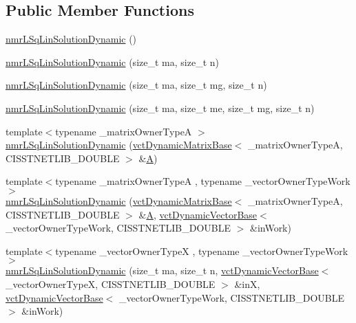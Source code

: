 \subsection*{Public Member Functions}
\begin{DoxyCompactItemize}
\item 
\hyperlink{classnmr_l_sq_lin_solution_dynamic_ae6a2c99c6f99fb37fcab94484dc319f7}{nmr\-L\-Sq\-Lin\-Solution\-Dynamic} ()
\item 
\hyperlink{classnmr_l_sq_lin_solution_dynamic_a863b29f7992d8d8c1ebbb426f9a37cca}{nmr\-L\-Sq\-Lin\-Solution\-Dynamic} (size\-\_\-t ma, size\-\_\-t n)
\item 
\hyperlink{classnmr_l_sq_lin_solution_dynamic_affb9fd9f3cbeca082e881f4c3861507e}{nmr\-L\-Sq\-Lin\-Solution\-Dynamic} (size\-\_\-t ma, size\-\_\-t mg, size\-\_\-t n)
\item 
\hyperlink{classnmr_l_sq_lin_solution_dynamic_aa8fa1fafacf4a28049e644616e7658f9}{nmr\-L\-Sq\-Lin\-Solution\-Dynamic} (size\-\_\-t ma, size\-\_\-t me, size\-\_\-t mg, size\-\_\-t n)
\item 
{\footnotesize template$<$typename \-\_\-matrix\-Owner\-Type\-A $>$ }\\\hyperlink{classnmr_l_sq_lin_solution_dynamic_a7279de18679a05313a2f26a10c5aca9f}{nmr\-L\-Sq\-Lin\-Solution\-Dynamic} (\hyperlink{classvct_dynamic_matrix_base}{vct\-Dynamic\-Matrix\-Base}$<$ \-\_\-matrix\-Owner\-Type\-A, C\-I\-S\-S\-T\-N\-E\-T\-L\-I\-B\-\_\-\-D\-O\-U\-B\-L\-E $>$ \&\hyperlink{classnmr_l_sq_lin_solution_dynamic_aa4a41abac141e2e55dd5cafb59169dfd}{A})
\item 
{\footnotesize template$<$typename \-\_\-matrix\-Owner\-Type\-A , typename \-\_\-vector\-Owner\-Type\-Work $>$ }\\\hyperlink{classnmr_l_sq_lin_solution_dynamic_a00b899c2a33937aa3944734a9a683b8e}{nmr\-L\-Sq\-Lin\-Solution\-Dynamic} (\hyperlink{classvct_dynamic_matrix_base}{vct\-Dynamic\-Matrix\-Base}$<$ \-\_\-matrix\-Owner\-Type\-A, C\-I\-S\-S\-T\-N\-E\-T\-L\-I\-B\-\_\-\-D\-O\-U\-B\-L\-E $>$ \&\hyperlink{classnmr_l_sq_lin_solution_dynamic_aa4a41abac141e2e55dd5cafb59169dfd}{A}, \hyperlink{classvct_dynamic_vector_base}{vct\-Dynamic\-Vector\-Base}$<$ \-\_\-vector\-Owner\-Type\-Work, C\-I\-S\-S\-T\-N\-E\-T\-L\-I\-B\-\_\-\-D\-O\-U\-B\-L\-E $>$ \&in\-Work)
\item 
{\footnotesize template$<$typename \-\_\-vector\-Owner\-Type\-X , typename \-\_\-vector\-Owner\-Type\-Work $>$ }\\\hyperlink{classnmr_l_sq_lin_solution_dynamic_a547dcd02ffd68251124d2661746b02d8}{nmr\-L\-Sq\-Lin\-Solution\-Dynamic} (size\-\_\-t ma, size\-\_\-t n, \hyperlink{classvct_dynamic_vector_base}{vct\-Dynamic\-Vector\-Base}$<$ \-\_\-vector\-Owner\-Type\-X, C\-I\-S\-S\-T\-N\-E\-T\-L\-I\-B\-\_\-\-D\-O\-U\-B\-L\-E $>$ \&in\-X, \hyperlink{classvct_dynamic_vector_base}{vct\-Dynamic\-Vector\-Base}$<$ \-\_\-vector\-Owner\-Type\-Work, C\-I\-S\-S\-T\-N\-E\-T\-L\-I\-B\-\_\-\-D\-O\-U\-B\-L\-E $>$ \&in\-Work)

\end{DoxyCompactItemize}
